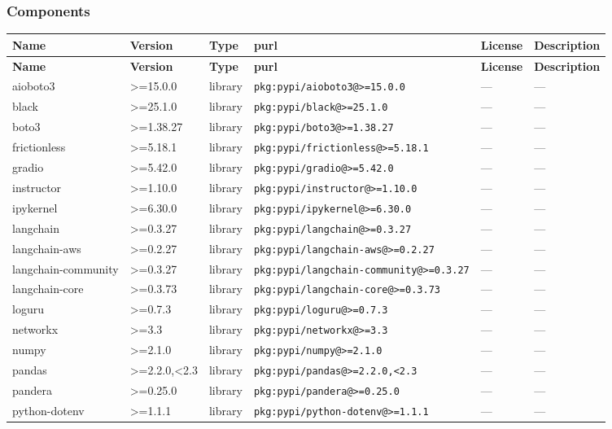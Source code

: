 \documentclass[11pt]{article}
\begin{document}
\subsubsection*{Components}
\begin{longtable}{|l|l|l|p{2.2cm}|l|p{4cm}|}
\hline
\textbf{Name} & \textbf{Version} & \textbf{Type} & \textbf{purl} & \textbf{License} & \textbf{Description} \\
\hline
\endfirsthead
\hline
\textbf{Name} & \textbf{Version} & \textbf{Type} & \textbf{purl} & \textbf{License} & \textbf{Description} \\
\hline
\endhead
aioboto3 & >=15.0.0 & library & \texttt{pkg:pypi/aioboto3@>=15.0.0} & — & — \\
black & >=25.1.0 & library & \texttt{pkg:pypi/black@>=25.1.0} & — & — \\
boto3 & >=1.38.27 & library & \texttt{pkg:pypi/boto3@>=1.38.27} & — & — \\
frictionless & >=5.18.1 & library & \texttt{pkg:pypi/frictionless@>=5.18.1} & — & — \\
gradio & >=5.42.0 & library & \texttt{pkg:pypi/gradio@>=5.42.0} & — & — \\
instructor & >=1.10.0 & library & \texttt{pkg:pypi/instructor@>=1.10.0} & — & — \\
ipykernel & >=6.30.0 & library & \texttt{pkg:pypi/ipykernel@>=6.30.0} & — & — \\
langchain & >=0.3.27 & library & \texttt{pkg:pypi/langchain@>=0.3.27} & — & — \\
langchain-aws & >=0.2.27 & library & \texttt{pkg:pypi/langchain-aws@>=0.2.27} & — & — \\
langchain-community & >=0.3.27 & library & \texttt{pkg:pypi/langchain-community@>=0.3.27} & — & — \\
langchain-core & >=0.3.73 & library & \texttt{pkg:pypi/langchain-core@>=0.3.73} & — & — \\
loguru & >=0.7.3 & library & \texttt{pkg:pypi/loguru@>=0.7.3} & — & — \\
networkx & >=3.3 & library & \texttt{pkg:pypi/networkx@>=3.3} & — & — \\
numpy & >=2.1.0 & library & \texttt{pkg:pypi/numpy@>=2.1.0} & — & — \\
pandas & >=2.2.0,<2.3 & library & \texttt{pkg:pypi/pandas@>=2.2.0,<2.3} & — & — \\
pandera & >=0.25.0 & library & \texttt{pkg:pypi/pandera@>=0.25.0} & — & — \\
python-dotenv & >=1.1.1 & library & \texttt{pkg:pypi/python-dotenv@>=1.1.1} & — & — \\

\end{longtable}
\end{document}
